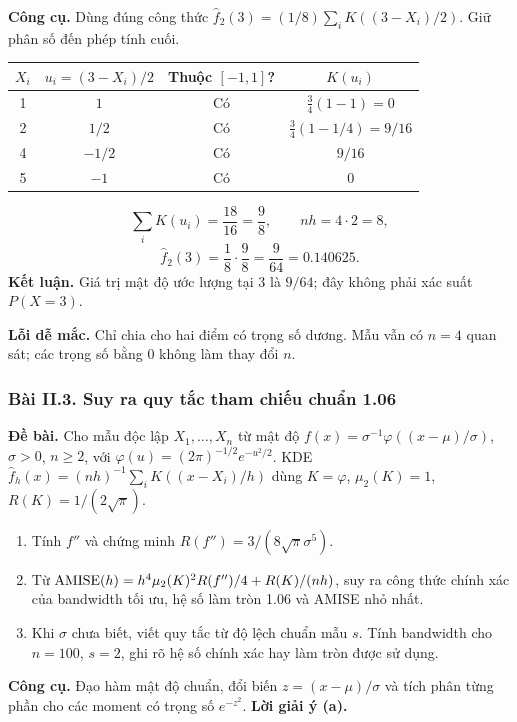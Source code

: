 \textbf{Công cụ.} Dùng đúng công thức
$\widehat f_2(3)=(1/8)\sum_iK((3-X_i)/2)$.
Giữ phân số đến phép tính cuối.

\begin{center}
\begin{tabular}{cccc}
\toprule $X_i$ & $u_i=(3-X_i)/2$ & Thuộc $[-1,1]$? & $K(u_i)$\\\midrule
1 & $1$ & Có & $\frac34(1-1)=0$\\
2 & $1/2$ & Có & $\frac34(1-1/4)=9/16$\\
4 & $-1/2$ & Có & $9/16$\\
5 & $-1$ & Có & $0$\\\bottomrule
\end{tabular}
\end{center}

\[
\sum_iK(u_i)=\frac{18}{16}=\frac98,\qquad nh=4\cdot2=8,
\]
\[
\boxed{\widehat f_2(3)=\frac18\cdot\frac98=\frac9{64}=0.140625.}
\]
\textbf{Kết luận.} Giá trị mật độ ước lượng tại 3 là $9/64$;
đây không phải xác suất $P(X=3)$.

\textbf{Lỗi dễ mắc.} Chỉ chia cho hai điểm có trọng số dương.
Mẫu vẫn có $n=4$ quan sát; các trọng số bằng 0 không làm thay đổi $n$.

\subsubsection*{Bài II.3. Suy ra quy tắc tham chiếu chuẩn 1.06}\label{ot45:normal-reference}
\textbf{Đề bài.} Cho mẫu độc lập $X_1,\ldots,X_n$ từ mật độ
$f(x)=\sigma^{-1}\varphi((x-\mu)/\sigma)$, $\sigma>0$, $n\geq2$,
với $\varphi(u)=(2\pi)^{-1/2}e^{-u^2/2}$.
KDE $\widehat f_h(x)=(nh)^{-1}\sum_iK((x-X_i)/h)$ dùng $K=\varphi$,
$\mu_2(K)=1$, $R(K)=1/(2\sqrt\pi)$.
\begin{enumerate}[label=(\alph*)]
\item Tính $f''$ và chứng minh $R(f'')=3/(8\sqrt\pi\sigma^5)$.
\item Từ $\operatorname{AMISE}(h)=h^4\mu_2(K)^2R(f'')/4+R(K)/(nh)$,
suy ra công thức chính xác của bandwidth tối ưu, hệ số làm tròn 1.06 và AMISE nhỏ nhất.
\item Khi $\sigma$ chưa biết, viết quy tắc từ độ lệch chuẩn mẫu $s$.
Tính bandwidth cho $n=100$, $s=2$, ghi rõ hệ số chính xác hay làm tròn được sử dụng.
\end{enumerate}

\textbf{Công cụ.} Đạo hàm mật độ chuẩn, đổi biến $z=(x-\mu)/\sigma$ và
tích phân từng phần cho các moment có trọng số $e^{-z^2}$.
\textbf{Lời giải ý (a).}

